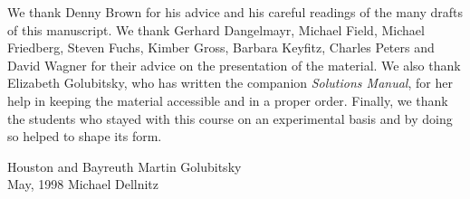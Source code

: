 \documentclass{ximera}
\begin{document}
We thank Denny Brown for his advice and his careful readings of the
many drafts of this manuscript.  We thank Gerhard Dangelmayr, Michael
Field, Michael Friedberg, Steven Fuchs, Kimber Gross, Barbara Keyfitz,
Charles Peters and David Wagner for their advice on the presentation
of the material.  We also thank Elizabeth Golubitsky, who has written
the companion {\em Solutions Manual\/}, for her help in keeping the
material accessible and in a proper order.  Finally, we thank the
students who stayed with this course on an experimental basis and by
doing so helped to shape its form.

\vspace{0.1in}

\noindent Houston and Bayreuth \hfill Martin Golubitsky \\
May, 1998  \hfill Michael Dellnitz
\end{document}

